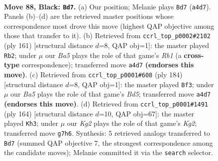 \documentclass[11pt]{article}
\begin{document}
\clearpage

\begin{figure}[p]\centering
\begin{subfigure}{0.46\textwidth}\centering
\resizebox{\linewidth}{!}{%
\newchessgame
\chessboard[
  setfen={8/R5k1/8/5p2/b4P2/3r4/7K/8 b - - 0 88},
  showmover=false,
  pgfstyle=straightmove, color=movearrow, markmove={a4-d7}
]}
\caption{}
\end{subfigure}\hfill
\begin{subfigure}{0.46\textwidth}\centering
\resizebox{\linewidth}{!}{%
\newchessgame
\chessboard[
  setfen={1r6/5k2/R7/8/p5K1/P7/8/8 b - - 5 81},
  showmover=false,
  pgfstyle=straightmove, color=movearrow, markmove={b8-b2}
]}
\caption{}
\end{subfigure}
\\[4pt]
\begin{subfigure}{0.46\textwidth}\centering
\resizebox{\linewidth}{!}{%
\newchessgame
\chessboard[
  setfen={8/8/p5R1/3Br3/8/7k/5K2/8 w - - 14 93},
  showmover=false,
  pgfstyle=straightmove, color=movearrow, markmove={d5-f3}
]}
\caption{}
\end{subfigure}\hfill
\begin{subfigure}{0.46\textwidth}\centering
\resizebox{\linewidth}{!}{%
\newchessgame
\chessboard[
  setfen={8/6k1/1R6/8/6P1/8/r5K1/8 w - - 5 83},
  showmover=false,
  pgfstyle=straightmove, color=movearrow, markmove={g2-h3}
]}
\caption{}
\end{subfigure}
\caption{\textbf{Move 88, Black: \texttt{Bd7}.} (a) Our position; Melanie plays \texttt{Bd7} (\texttt{a4d7}). Panels (b)--(d) are the retrieved master positions whose correspondence most drove this move (highest QAP objective among those that transfer to it). (b) Retrieved from \texttt{ccrl\_top\_p0002\#2102} (ply 161) [structural distance $d$=8, QAP obj=1]: the master played \texttt{Rb2}; under $\mu$ our \emph{Ba5} plays the role of that game's \emph{Rb1} (a \textbf{cross-type} correspondence); transferred move \texttt{a4d7} \textbf{(endorses this move)}. (c) Retrieved from \texttt{ccrl\_top\_p0001\#608} (ply 184) [structural distance $d$=8, QAP obj=1]: the master played \texttt{Bf3}; under $\mu$ our \emph{Ba5} plays the role of that game's \emph{Bd5}; transferred move \texttt{a4d7} \textbf{(endorses this move)}. (d) Retrieved from \texttt{ccrl\_top\_p0001\#1491} (ply 164) [structural distance $d$=10, QAP obj=67]: the master played \texttt{Kh3}; under $\mu$ our \emph{Kg2} plays the role of that game's \emph{Kg2}; transferred move \texttt{g7h6}. Synthesis: 5 retrieved analogs transferred to \texttt{Bd7} (summed QAP objective 7, the strongest correspondence among the candidate moves); Melanie committed it via the \texttt{search} selector.}
\label{fig:thought-m175}
\end{figure}
\end{document}
